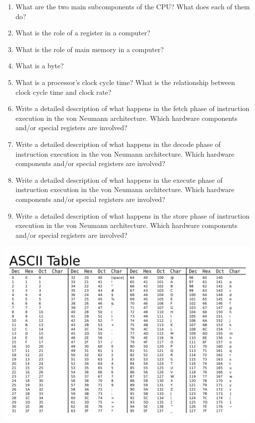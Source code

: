 \documentclass[12pt]{article}
\begin{document}
\begin{enumerate}
\item What are the two main subcomponents of the CPU? What does each of them do?
\vfill
\item What is the role of a register in a computer?
\vfill
\item What is the role of main memory in a computer?
\vfill
\item What is a byte?
\vfill
\item What is a processor's clock cycle time? What is the relationship between clock cycle time and clock rate?
\vfill

\pagebreak

\item Write a detailed description of what happens in the fetch phase of instruction execution in the von Neumann architecture. Which hardware components and/or special registers are involved?
\vfill
\item Write a detailed description of what happens in the decode phase of instruction execution in the von Neumann architecture. Which hardware components and/or special registers are involved?
\vfill
\item Write a detailed description of what happens in the execute phase of instruction execution in the von Neumann architecture. Which hardware components and/or special registers are involved?
\vfill
\item Write a detailed description of what happens in the store phase of instruction execution in the von Neumann architecture. Which hardware components and/or special registers are involved?
\end{enumerate}

\vfill

\standardsfooter


\newpage

\includegraphics[height=\textheight]{ascii-table.png}
\end{document}
